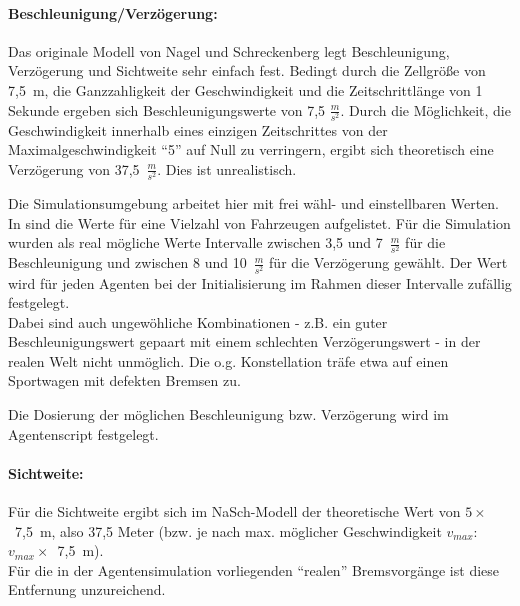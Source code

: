 
\paragraph*{Beschleunigung/Verzögerung:}
\label{beschl-verz}
Das originale Modell von Nagel und Schreckenberg legt Beschleunigung, Verzögerung und Sichtweite sehr einfach fest.
Bedingt durch die Zellgröße von \mbox{7,5 m}, die Ganzzahligkeit der Geschwindigkeit und die Zeitschrittlänge von 1 Sekunde ergeben sich Beschleunigungswerte von 7,5 $\frac{m}{s^{2}}$. 
Durch die Möglichkeit, die Geschwindigkeit innerhalb eines einzigen Zeitschrittes von der Maximalgeschwindigkeit \enquote{5} auf Null zu verringern, ergibt sich theoretisch eine Verzögerung von \mbox{37,5 $\frac{m}{s^{2}}$}.
Dies ist unrealistisch.

Die Simulationsumgebung arbeitet hier mit frei wähl- und einstellbaren Werten. 
In \cite{unfallrekonstruktion} sind die Werte für eine Vielzahl von Fahrzeugen aufgelistet. 
Für die Simulation wurden als real mögliche Werte Intervalle zwischen 3,5 und \mbox{7 $\frac{m}{s^{2}}$} für die Beschleunigung und zwischen 8 und \mbox{10 $\frac{m}{s^{2}}$} für die Verzögerung gewählt.
Der Wert wird für jeden Agenten bei der Initialisierung im Rahmen dieser Intervalle zufällig festgelegt.
\\
Dabei sind auch ungewöhliche Kombinationen - z.B. ein guter Beschleunigungswert gepaart mit einem schlechten Verzögerungswert - in der realen Welt nicht unmöglich.
Die o.g. Konstellation träfe etwa auf einen Sportwagen mit defekten Bremsen zu.

Die Dosierung der möglichen Beschleunigung bzw. Verzögerung wird im Agentenscript festgelegt.

\paragraph*{Sichtweite:}
\label{sec:sichtweite}
Für die Sichtweite ergibt sich im NaSch-Modell der theoretische Wert von \mbox{$ 5 \times $ 7,5 m}, also 37,5 Meter (bzw. je nach max. möglicher Geschwindigkeit  $ v_{max} $: \mbox{$ v_{max} \times $ 7,5 m}).
\\
Für die in der Agentensimulation vorliegenden \enquote{realen} Bremsvorgänge ist diese Entfernung unzureichend. 


